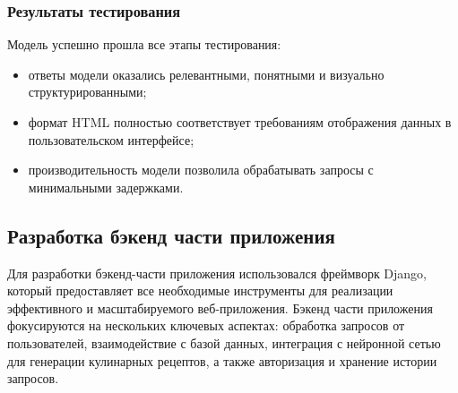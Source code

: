 {{\subsubsection*{Результаты тестирования}
Модель успешно прошла все этапы тестирования:
\begin{itemize}
    \item ответы модели оказались релевантными, понятными и визуально структурированными;
    \item формат HTML полностью соответствует требованиям отображения данных в пользовательском интерфейсе;
    \item производительность модели позволила обрабатывать запросы с минимальными задержками.
\end{itemize}

}
\newpage

\subsection{Разработка бэкенд части приложения}
Для разработки бэкенд-части приложения использовался фреймворк Django, который предоставляет все необходимые инструменты для реализации эффективного и масштабируемого веб-приложения. Бэкенд части приложения фокусируются на нескольких ключевых аспектах: обработка запросов от пользователей, взаимодействие с базой данных, интеграция с нейронной сетью для генерации кулинарных рецептов, а также авторизация и хранение истории запросов.

}
